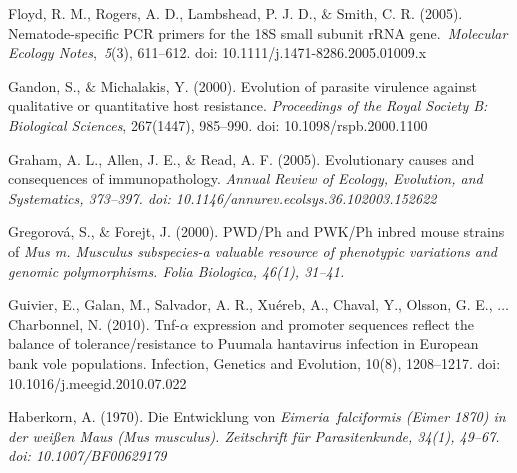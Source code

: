\documentclass[12pt]{article}
\renewcommand{\_}{\kern-1.5pt\textunderscore\kern-1.5pt}
\begin{document}
\begin{FlushLeft}
Floyd, R. M., Rogers, A. D., Lambshead, P. J. D., $\&$  Smith, C. R. (2005). Nematode-specific PCR primers for the 18S small subunit rRNA gene. \textit{Molecular Ecology Notes}, \textit{5}(3), 611–612. doi: 10.1111/j.1471-8286.2005.01009.x
\end{FlushLeft}\par

\begin{FlushLeft}
\textcolor[HTML]{FF0000}{Gandon, S., $\&$  Michalakis, Y. (2000). Evolution of parasite virulence against qualitative or quantitative host resistance. \textit{Proceedings of the Royal Society B: Biological Sciences}, 267(1447), 985–990. doi: 10.1098/rspb.2000.1100}
\end{FlushLeft}\par

\begin{FlushLeft}
Graham, A. L., Allen, J. E., $\&$  Read, A. F. (2005). Evolutionary causes and consequences of immunopathology. \textit{Annual Review of Ecology, Evolution, and Systematics, 373–397. doi: 10.1146/annurev.ecolsys.36.102003.152622}
\end{FlushLeft}\par

\begin{FlushLeft}
Gregorová, S., $\&$  Forejt, J. (2000). PWD/Ph and PWK/Ph inbred mouse strains of \textit{Mus m. Musculus subspecies-a valuable resource of phenotypic variations and genomic polymorphisms. Folia Biologica, 46(1), 31–41.}
\end{FlushLeft}\par

\textcolor[HTML]{FF0000}{Guivier, E., Galan, M., Salvador, A. R., Xuéreb, A., Chaval, Y., Olsson, G. E., $ \ldots $  Charbonnel, N. (2010). Tnf-$ \alpha $  expression and promoter sequences reflect the balance of tolerance/resistance to Puumala hantavirus infection in European bank vole populations. Infection, Genetics and Evolution, 10(8), 1208–1217. doi: 10.1016/j.meegid.2010.07.022}\par

\begin{FlushLeft}
Haberkorn, A. (1970). Die Entwicklung von \textit{Eimeria falciformis (Eimer 1870) in der weißen Maus (Mus musculus). Zeitschrift für Parasitenkunde, 34(1), 49–67. doi: 10.1007/BF00629179}
\end{FlushLeft}\par
\end{document}
